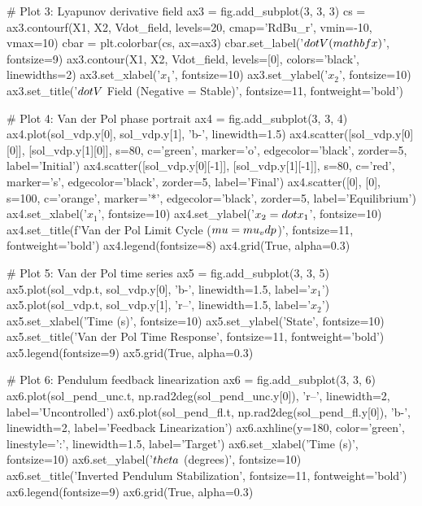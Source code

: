 \documentclass[a4paper, 11pt]{article}
\begin{document}
\begin{pycode}
# Plot 3: Lyapunov derivative field
ax3 = fig.add_subplot(3, 3, 3)
cs = ax3.contourf(X1, X2, Vdot_field, levels=20, cmap='RdBu_r', vmin=-10, vmax=10)
cbar = plt.colorbar(cs, ax=ax3)
cbar.set_label('$\\dot{V}(\\mathbf{x})$', fontsize=9)
ax3.contour(X1, X2, Vdot_field, levels=[0], colors='black', linewidths=2)
ax3.set_xlabel('$x_1$', fontsize=10)
ax3.set_ylabel('$x_2$', fontsize=10)
ax3.set_title('$\\dot{V}$ Field (Negative = Stable)', fontsize=11, fontweight='bold')

# Plot 4: Van der Pol phase portrait
ax4 = fig.add_subplot(3, 3, 4)
ax4.plot(sol_vdp.y[0], sol_vdp.y[1], 'b-', linewidth=1.5)
ax4.scatter([sol_vdp.y[0][0]], [sol_vdp.y[1][0]], s=80, c='green', marker='o',
           edgecolor='black', zorder=5, label='Initial')
ax4.scatter([sol_vdp.y[0][-1]], [sol_vdp.y[1][-1]], s=80, c='red', marker='s',
           edgecolor='black', zorder=5, label='Final')
ax4.scatter([0], [0], s=100, c='orange', marker='*', edgecolor='black', zorder=5,
           label='Equilibrium')
ax4.set_xlabel('$x_1$', fontsize=10)
ax4.set_ylabel('$x_2 = \\dot{x}_1$', fontsize=10)
ax4.set_title(f'Van der Pol Limit Cycle ($\\mu = {mu_vdp}$)', fontsize=11, fontweight='bold')
ax4.legend(fontsize=8)
ax4.grid(True, alpha=0.3)

# Plot 5: Van der Pol time series
ax5 = fig.add_subplot(3, 3, 5)
ax5.plot(sol_vdp.t, sol_vdp.y[0], 'b-', linewidth=1.5, label='$x_1$')
ax5.plot(sol_vdp.t, sol_vdp.y[1], 'r--', linewidth=1.5, label='$x_2$')
ax5.set_xlabel('Time (s)', fontsize=10)
ax5.set_ylabel('State', fontsize=10)
ax5.set_title('Van der Pol Time Response', fontsize=11, fontweight='bold')
ax5.legend(fontsize=9)
ax5.grid(True, alpha=0.3)

# Plot 6: Pendulum feedback linearization
ax6 = fig.add_subplot(3, 3, 6)
ax6.plot(sol_pend_unc.t, np.rad2deg(sol_pend_unc.y[0]), 'r--',
        linewidth=2, label='Uncontrolled')
ax6.plot(sol_pend_fl.t, np.rad2deg(sol_pend_fl.y[0]), 'b-',
        linewidth=2, label='Feedback Linearization')
ax6.axhline(y=180, color='green', linestyle=':', linewidth=1.5, label='Target')
ax6.set_xlabel('Time (s)', fontsize=10)
ax6.set_ylabel('$\\theta$ (degrees)', fontsize=10)
ax6.set_title('Inverted Pendulum Stabilization', fontsize=11, fontweight='bold')
ax6.legend(fontsize=9)
ax6.grid(True, alpha=0.3)


\end{pycode}
\end{document}
